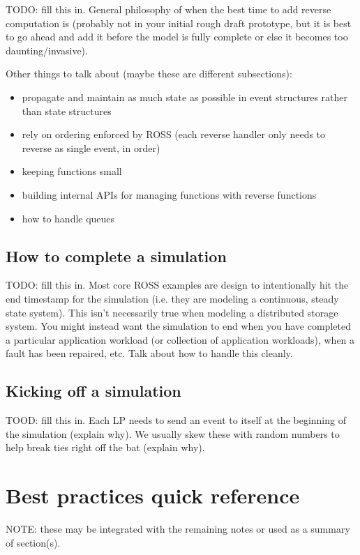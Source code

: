 \documentclass[conference,10pt,compsocconf,onecolumn]{IEEEtran}
\begin{document}
TODO: fill this in.  General philosophy of when the best time to add reverse
computation is (probably not in your initial rough draft prototype, but it
is best to go ahead and add it before the model is fully complete or else it
becomes too daunting/invasive).

Other things to talk about (maybe these are different subsections):
\begin{itemize}
\item propagate and maintain as much state as possible in event structures
rather than state structures
\item rely on ordering enforced by ROSS (each
reverse handler only needs to reverse as single event, in order)
\item keeping functions small 
\item building internal APIs for managing functions with reverse functions
\item how to handle queues
\end{itemize}

\subsection{How to complete a simulation}

TODO: fill this in.  Most core ROSS examples are design to intentionally hit
the end timestamp for the simulation (i.e. they are modeling a continuous,
steady state system).  This isn't necessarily true when modeling a
distributed storage system.  You might instead want the simulation to end
when you have completed a particular application workload (or collection of
application workloads), when a fault has been repaired, etc.  Talk about how
to handle this cleanly.

\subsection{Kicking off a simulation}
\label{sec_kickoff}

TOOD: fill this in.  Each LP needs to send an event to itself at the
beginning of the simulation (explain why).  We usually skew these with
random numbers to help break ties right off the bat (explain why).

\section{Best practices quick reference}

NOTE: these may be integrated with the remaining notes or used as a summary of
section(s).
\end{document}
